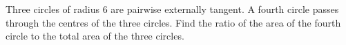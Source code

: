 Three circles of radius $6$ are pairwise externally tangent. A fourth circle passes through the centres of the three circles. Find the ratio of the area of the fourth circle to the total area of the three circles.
